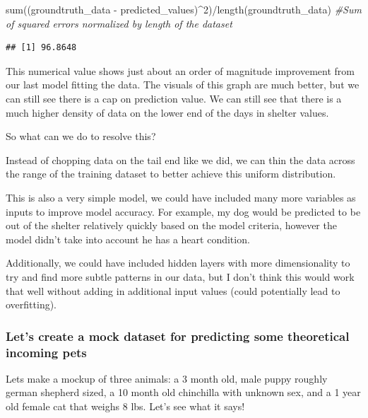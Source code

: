 \documentclass[
]{article}
\newenvironment{Shaded}{\begin{snugshade}}{\end{snugshade}}
\newcommand{\CommentTok}[1]{\textcolor[rgb]{0.56,0.35,0.01}{\textit{#1}}}
\newcommand{\DecValTok}[1]{\textcolor[rgb]{0.00,0.00,0.81}{#1}}
\newcommand{\FunctionTok}[1]{\textcolor[rgb]{0.00,0.00,0.00}{#1}}
\newcommand{\NormalTok}[1]{#1}
\newcommand{\SpecialCharTok}[1]{\textcolor[rgb]{0.00,0.00,0.00}{#1}}
\begin{document}
\begin{Shaded}
\begin{Highlighting}[]
\FunctionTok{sum}\NormalTok{((groundtruth\_data }\SpecialCharTok{{-}}\NormalTok{ predicted\_values)}\SpecialCharTok{\^{}}\DecValTok{2}\NormalTok{)}\SpecialCharTok{/}\FunctionTok{length}\NormalTok{(groundtruth\_data) }\CommentTok{\#Sum of squared errors normalized by length of the dataset}
\end{Highlighting}
\end{Shaded}

\begin{verbatim}
## [1] 96.8648
\end{verbatim}

This numerical value shows just about an order of magnitude improvement
from our last model fitting the data. The visuals of this graph are much
better, but we can still see there is a cap on prediction value. We can
still see that there is a much higher density of data on the lower end
of the days in shelter values.

So what can we do to resolve this?

Instead of chopping data on the tail end like we did, we can thin the
data across the range of the training dataset to better achieve this
uniform distribution.

This is also a very simple model, we could have included many more
variables as inputs to improve model accuracy. For example, my dog would
be predicted to be out of the shelter relatively quickly based on the
model criteria, however the model didn't take into account he has a
heart condition.

Additionally, we could have included hidden layers with more
dimensionality to try and find more subtle patterns in our data, but I
don't think this would work that well without adding in additional input
values (could potentially lead to overfitting).

\hypertarget{lets-create-a-mock-dataset-for-predicting-some-theoretical-incoming-pets}{%
\subsubsection{Let's create a mock dataset for predicting some
theoretical incoming
pets}\label{lets-create-a-mock-dataset-for-predicting-some-theoretical-incoming-pets}}

Lets make a mockup of three animals: a 3 month old, male puppy roughly
german shepherd sized, a 10 month old chinchilla with unknown sex, and a
1 year old female cat that weighs 8 lbs. Let's see what it says!
\end{document}

